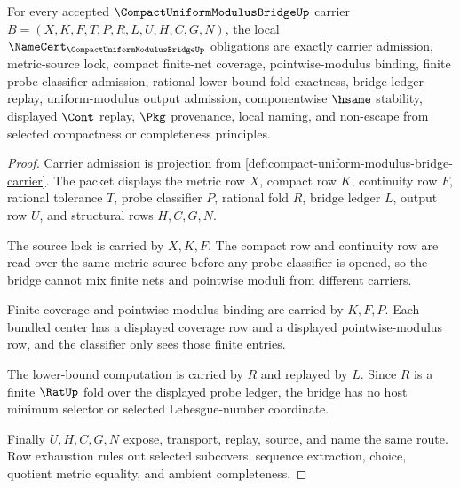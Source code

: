 \begin{theorem}
\label{thm:compact-uniform-modulus-bridge-namecert-obligations}
For every accepted $\CompactUniformModulusBridgeUp$ carrier $B=(X,K,F,T,P,R,L,U,H,C,G,N)$, the local $\NameCert_{\CompactUniformModulusBridgeUp}$ obligations are exactly carrier admission, metric-source lock, compact finite-net coverage, pointwise-modulus binding, finite probe classifier admission, rational lower-bound fold exactness, bridge-ledger replay, uniform-modulus output admission, componentwise $\hsame$ stability, displayed $\Cont$ replay, $\Pkg$ provenance, local naming, and non-escape from selected compactness or completeness principles.
\end{theorem}
\begin{proof}
Carrier admission is projection from \autoref{def:compact-uniform-modulus-bridge-carrier}. The packet displays the metric row $X$, compact row $K$, continuity row $F$, rational tolerance $T$, probe classifier $P$, rational fold $R$, bridge ledger $L$, output row $U$, and structural rows $H,C,G,N$.

The source lock is carried by $X,K,F$. The compact row and continuity row are read over the same metric source before any probe classifier is opened, so the bridge cannot mix finite nets and pointwise moduli from different carriers.

Finite coverage and pointwise-modulus binding are carried by $K,F,P$. Each bundled center has a displayed coverage row and a displayed pointwise-modulus row, and the classifier only sees those finite entries.

The lower-bound computation is carried by $R$ and replayed by $L$. Since $R$ is a finite $\RatUp$ fold over the displayed probe ledger, the bridge has no host minimum selector or selected Lebesgue-number coordinate.

Finally $U,H,C,G,N$ expose, transport, replay, source, and name the same route. Row exhaustion rules out selected subcovers, sequence extraction, choice, quotient metric equality, and ambient completeness.
\end{proof}


